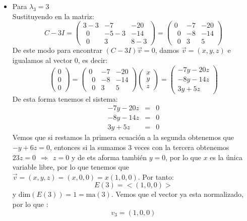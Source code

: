 \begin{itemize}
\begin{itemize}
        
        \item Para $\lambda_3=3$\\
        Sustituyendo en la matriz:
        \[C-3I=\begin{pmatrix}3-3&-7&-20\\ \:\:0&-5-3&-14\\ \:\:0&3&8-3\end{pmatrix}=\begin{pmatrix}0&-7&-20\\ \:\:0&-8&-14\\ \:\:0&3&5\end{pmatrix}\]
        De este modo para encontrar $(C-3I)\Vec{v}=0$, damos $\vec{v}=(x,y,z)$ e igualamos al vector 0, es decir:
        \[\begin{pmatrix}0\\0\\0\end{pmatrix}=\begin{pmatrix}0&-7&-20\\ \:\:0&-8&-14\\ \:\:0&3&5\end{pmatrix}\begin{pmatrix}x\\y\\z\end{pmatrix}=\begin{pmatrix}-7y-20z\\-8y-14z\\3y+5z\end{pmatrix}\]
        De esta forma tenemos el sistema:
        \begin{eqnarray*}
        -7y-20z&=&0\\
        -8y-14z&=&0\\
        3y+5z&=&0
        \end{eqnarray*}
        Vemos que si restamos la primera ecuaci\'on a la segunda obtenemos que $-y+6z=0$, entonces si la sumamos 3 veces con la tercera obtenemos $23z=0~~\Longrightarrow~~z=0$ y de ets aforma tambi\'en $y=0$, por lo que $x$ es la \'unica variable libre, por lo que tenemos que $\displaystyle \vec{v}=(x,y,z)=(x,0,0)=x(1,0,0)$. Por tanto:
        \[E(3)=<(1,0,0)>\]
        y $\text{dim}(E(3))=1=\text{ma}(3)$. 
        Vemos que el vector ya esta normalizado, por lo que :
        \[v_3=(1,0,0)\]
        

\end{itemize}
\end{itemize}
